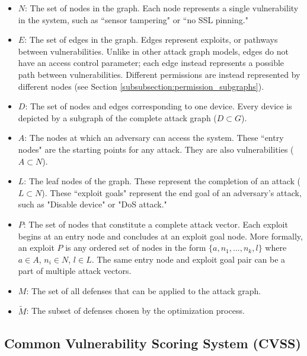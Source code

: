 \documentclass[10pt,journal,compsoc]{IEEEtran}
\begin{document}
\begin{itemize}

\item \(N\): The set of nodes in the graph. Each node represents a single vulnerability in the system, such as ``sensor tampering" or ``no SSL pinning."
\item \(E\): The set of edges in the graph. Edges represent exploits, or pathways between vulnerabilities. Unlike in other attack graph models, edges do not have an 
access control parameter; each edge instead represents a possible path between vulnerabilities. 
Different permissions are instead represented by different nodes (see 
Section \ref{subsubsection:permission_subgraphs}).
\item \(D\): The set of nodes and edges corresponding to one device. Every device is depicted
by a subgraph of the complete attack graph (\(D \subset G\)).
\item $A$: The nodes at which an adversary can access the system. These ``entry nodes" are the starting points for any attack. They are also vulnerabilities ($A \subset N$).
\item $L$: The leaf nodes of the graph. These represent the completion of an attack ($L \subset N$). These ``exploit goals"  represent the end goal of an adversary's attack, such as "Disable device" or "DoS attack."
\item $P$: The set of nodes that constitute a complete attack vector. Each exploit begins at an entry 
node and concludes at an exploit goal node. More formally, an exploit $P$ is any ordered set of 
nodes in the form $\{ a, n_1, ..., n_k, l\}$ where $  a \in A $, $ n_i \in N $, $ l \in L $. The same entry node and exploit goal pair can be a part of multiple attack vectors.
\item $M$: The set of all defenses that can be applied to the attack graph.
\item $\widetilde{M}$: The subset of defenses chosen by the optimization process.
\end{itemize}

\subsection{Common Vulnerability Scoring System (CVSS)}
\end{document}
